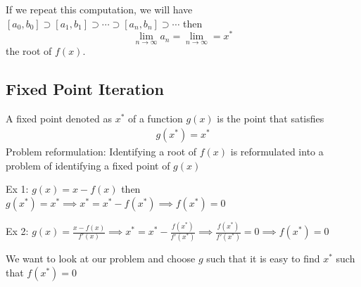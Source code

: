 \documentclass[12pt]{scrartcl}
\begin{document}
\begin{note}
  If we repeat this computation, we will have $[a_0, b_0] \supset [a_1, b_1] \supset \cdots \supset [a_n, b_n] \supset \cdots$
  then 
  \[\lim_{n\to\infty} a_n = \lim_{n\to\infty} = x^*\]
  the root of $f(x)$.
\end{note}

\subsection{Fixed Point Iteration}

\begin{definition}
  A fixed point denoted as $x^*$ of a function $g(x)$ is the point that satisfies 
  \begin{align*}
    g(x^*) = x^*
  \end{align*}
  Problem reformulation: Identifying a root of $f(x)$ is reformulated into a problem of identifying a fixed point of $g(x)$
\end{definition}

\begin{example}
    Ex 1: $g(x) = x - f(x)$ then $g(x^*) = x^* \implies x^* = x^* - f(x^*) \implies f(x^*) = 0$

    Ex 2: $g(x) = \frac{x - f(x)}{f'(x)} \implies x^* = x^* - \frac{f(x^*)}{f'(x^*)} \implies \frac{f(x^*)}{f'(x^*)} = 0 \implies f(x^*) = 0$

    We want to look at our problem and choose $g$ such that it is easy to find $x^*$ such that $f(x^*) = 0$
\end{example}
\end{document}

